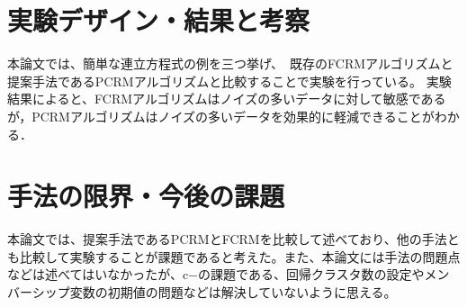 \documentclass[10pt,onecolumn]{jsarticle}
\begin{document}
\section{実験デザイン・結果と考察}
本論文では、簡単な連立方程式の例を三つ挙げ、　既存のFCRMアルゴリズムと提案手法であるPCRMアルゴリズムと比較することで実験を行っている。
実験結果によると、FCRMアルゴリズムはノイズの多いデータに対して敏感であるが，PCRMアルゴリズムはノイズの多いデータを効果的に軽減できることがわかる．

\section{手法の限界・今後の課題}
本論文では、提案手法であるPCRMとFCRMを比較して述べており、他の手法とも比較して実験することが課題であると考えた。また、本論文には手法の問題点などは述べてはいなかったが、c$-$の課題である、回帰クラスタ数の設定やメンバーシップ変数の初期値の問題などは解決していないように思える。




\end{document}
